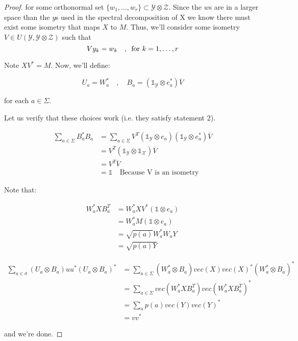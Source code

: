 \documentclass{article}
\begin{document}
\begin{proof}
for some orthonormal set $\{ w_1,\ldots,w_r\} \subset \mathcal{Y}\otimes
\mathcal{Z}$. Since the $w$s are in a larger space than the $y$s used in the
spectral decomposition of X we know there must exist some isometry that maps $X$
to $M$. Thus, we'll consider some isometry $V \in
U(\mathcal{Y},\mathcal{Y}\otimes \mathcal{Z})$ such that 
\[ 
    V y_k = w_k \quad, \enskip \text{for } k=1,\ldots,r 
\]

Note $ XV^* = M $. Now, we'll define:

\[ 
    U_a = W_a^* \quad,\quad B_a = \left( \mathds{1}_{\mathcal{Y}}\otimes e_a^*
    \right) \overline{V} 
\]

for each $a \in \Sigma$.

Let us verify that these choices work (i.e. they satisfy statement 2).

\begin{align*}
    \sum_{a\in\Sigma} B_a^* B_a &= \sum_{a\in\Sigma} V^T \left(
    \mathds{1}_{\mathcal{Y}} \otimes e_a \right) \left( \mathds{1}_{\mathcal{Y}}
\otimes e_a^*\right)\overline{V} \\
&= V^T \left( \mathds{1}_{\mathcal{Y}} \otimes   \mathds{1}_{\mathcal{X}}
\right) \overline{V} \\
&= V^T \overline{V} \\
&= \mathds{1} \quad \text{Because V is an isometry}
\end{align*}


Note that:

\begin{align*}
    W_a^* X B_a^T &= W_a^* XV^* \left( \mathds{1} \otimes e_a \right) \\
                  &= W_a^* M \left( \mathds{1}\otimes e_a \right)\\
                  &= \sqrt{p(a)} W_a^* W_a Y \\
                  &= \sqrt{p(a) Y}
\end{align*}

\begin{align*}
    \sum_{a \in \sigma} \left( U_a \otimes B_a \right) u u^* \left( U_a \otimes
    B_a\right)^* &= \sum_{a\in\Sigma} \left( W_a^* \otimes B_a \right) vec(X)
        vec(X)^* \left( W_a^* \otimes B_a \right)^* \\
        &= \sum_{a\in\Sigma} vec \left( W_a^* X B_a^T \right) vec(W_a^* X
        B_a^T)^* \\
        &= \sum_a p(a) vec(Y) vec(Y)^* \\
        &= vv^*
\end{align*}

and we're done.
\end{proof}
\end{document}
